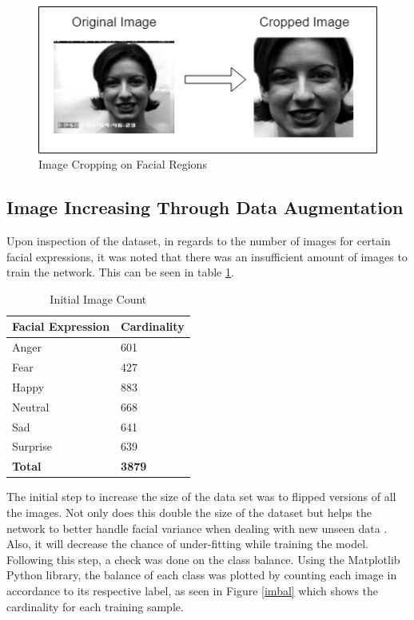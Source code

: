 \begin{figure}[ht]
	\begin{center}
		\advance\leftskip-3cm
		\advance\rightskip-3cm
		\includegraphics[keepaspectratio=true,scale=0.9]{__resources/DATASET/crop.png}
		\caption{Image Cropping on Facial Regions}
		\label{crop}
	\end{center}
\end{figure}
\newpage


\subsection{Image Increasing Through Data Augmentation}
Upon inspection of the dataset, in regards to the number of images for certain facial expressions, it was noted that there was an insufficient amount of images to train the network. This can be seen in table \ref{table: count}. 
\begin{table}[ht]
	\begin{tabular}{ |p{10cm}||p{3cm}|}
		\hline
		\textbf{Facial Expression} & \textbf{Cardinality}\\
		\hline
		\hline
		Anger & 601 \\
		\hline
		Fear & 427	\\
		\hline
		Happy & 883\\
		\hline
		Neutral & 668\\
		\hline
		Sad & 641	\\
		\hline
		Surprise  & 639	\\
		\hline
		\textbf{Total}  & \textbf{3879}	\\
		\hline
	\end{tabular}
	\caption{Initial Image Count}
	\label{table: count}
\end{table}

The initial step to increase the size of the data set was to flipped versions of all the images. Not only does this double the size of the dataset but helps the network to better handle facial variance when dealing with new unseen data \citep{LOPES}. Also, it will decrease the chance of under-fitting while training the model. Following this step, a check was done on the class balance. Using the Matplotlib Python library, the balance of each class was plotted by counting each image in accordance to its respective label, as seen in Figure \ref{imbal} which shows the cardinality for each training sample.

